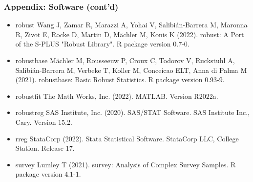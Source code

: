 \documentclass[framenumber,t]{beamer}
\begin{document}
\begin{frame}
    \frametitle{Appendix: Software {\small (cont'd)}}
    {\footnotesize
    \begin{itemize}
        \setlength\itemsep{0.25em}
        \item \alert{robust} Wang J, Zamar R, Marazzi A, Yohai V,
            Salibián-Barrera M, Maronna R, Zivot E, Rocke D, Martin D,
            Mächler M, Konis K (2022). robust: A Port of the S-PLUS
            "Robust Library".  R package version 0.7-0.
        \item \alert{robustbase} Mächler M, Rousseeuw P, Croux C, Todorov V,
            Ruckstuhl A, Salibián-Barrera M, Verbeke T, Koller M, Conceicao ELT,
            Anna di Palma M (2021). robustbase: Basic Robust Statistics.
            R package version 0.93-9.
        \item \alert{robustfit} The Math Works, Inc. (2022). MATLAB. Version
            R2022a.
        \item \alert{robustreg} SAS Institute, Inc. (2020). SAS/STAT Software.
            SAS Institute Inc., Cary. Version 15.2.
        \item \alert{rreg} StataCorp (2022). Stata Statistical Software.
            StataCorp LLC, College Station. Release 17.
        \item \alert{survey} Lumley T (2021). survey: Analysis of Complex
            Survey Samples. R package version 4.1-1.
    \end{itemize}
    }
\end{frame}
\end{document}
